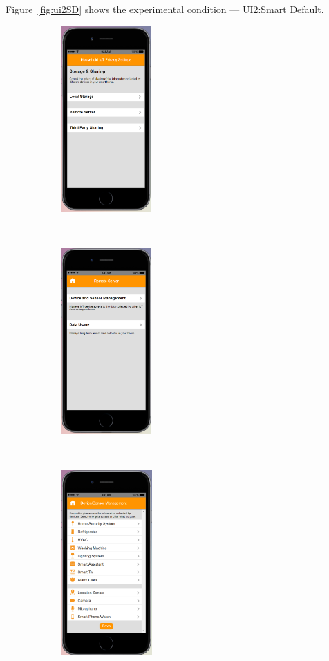 Figure~\ref{fig:ui2SD} shows the experimental condition --- UI2:Smart Default.
\begin{figure}
	\centering
	\begin{subfigure}[t]{0.2\textwidth}
	\centering
	\includegraphics[height=2.8in]{figures/ui2sd1.png}
	\end{subfigure}%
	~~~~~
	\begin{subfigure}[t]{0.2\textwidth}
		\centering
		\includegraphics[height=2.8in]{figures/ui2sd2.png}
	\end{subfigure}%
	~~~~~
	\begin{subfigure}[t]{0.2\textwidth}
		\centering
		\includegraphics[height=2.8in]{figures/ui2sd3.png}

\end{subfigure}
\end{figure}
